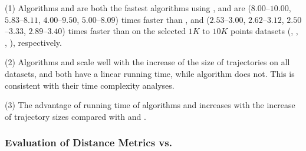 {%

\ni(1) Algorithms \cist and \cista are both the fastest \lsa algorithms using \sed,
and are {($8.00$--$10.00$, $5.83$--$8.11$, $4.00$--$9.50$, $5.00$--$8.09$) times faster than \dps,
	and {($2.53$--$3.00$, $2.62$--$3.12$, $2.50$--$3.33$, $2.89$--$3.40$)}} times faster than \squishe on the selected $1K$ to $10K$ points datasets (\sercar,
\geolife, \mopsi, \pricar), respectively.

\ni(2) Algorithms \cist and \cista scale well with the increase of the size of trajectories on all datasets,
and both have a linear running time, while algorithm \dps does not.
This is consistent with their time complexity analyses.

\ni(3) The advantage of running time of algorithms \cist and \cista increases with the increase of trajectory sizes compared with \dps and \squishe.



\subsubsection{Evaluation of Distance Metrics \ped vs. \sed}


}
